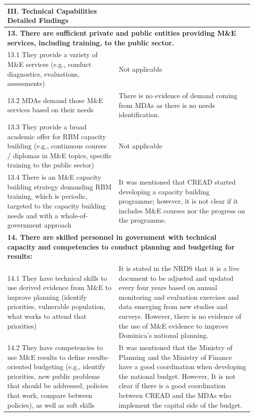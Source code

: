 \documentclass[
  10pt,
]{book}
\begin{document}
\begin{table}
\centering
\begin{tabular}[t]{l|l}
\hline
III. Technical Capabilities Detailed Findings &  \\
\hline
\multicolumn{2}{l}{\textbf{13. There are sufficient private and public entities providing M\&E services, including training, to the public sector.}}\\
\hline
\hspace{1em}13.1 They provide a variety of M\&E services (e.g., conduct diagnostics, evaluations, assessments) & Not applicable\\
\hline
\hspace{1em}13.2 MDAs demand those M\&E services based on their needs & There is no evidence of demand coming from MDAs as there is no needs identification.\\
\hline
\hspace{1em}13.3 They provide a broad academic offer for RBM capacity building (e.g., continuous courses / diplomas in M\&E topics, specific training to the public sector) & Not applicable\\
\hline
\hspace{1em}13.4 There is an M\&E capacity building strategy demanding RBM training, which is periodic, targeted to the capacity building needs and with a whole-of-government approach & It was mentioned that CREAD started developing a capacity building programme; however, it is not clear if it includes M\&E courses nor the progress on the programme.\\
\hline
\multicolumn{2}{l}{\textbf{14. There are skilled personnel in government with technical capacity and competencies to conduct planning and budgeting for results:}}\\
\hline
\hspace{1em}14.1 They have technical skills to use derived evidence from M\&E to improve planning (identify priorities, vulnerable population, what works to attend that priorities) & It is stated in the NRDS that it is a live document to be adjusted and updated every four years based on annual monitoring and evaluation exercises and data emerging from new studies and surveys. However, there is no evidence of the use of M\&E evidence to improve Dominica’s national planning.\\
\hline
\hspace{1em}14.2 They have competencies to use M\&E results to define results-oriented budgeting (e.g., identify priorities, new public problems that should be addressed, policies that work, compare between policies), as well as soft skills & It was mentioned that the Ministry of Planning and the Ministry of Finance have a good coordination when developing the national budget. However, It is not clear if there is a good coordination between CREAD and the MDAs who implement the capital side of the budget.\\

\end{tabular}
\end{table}
\end{document}
